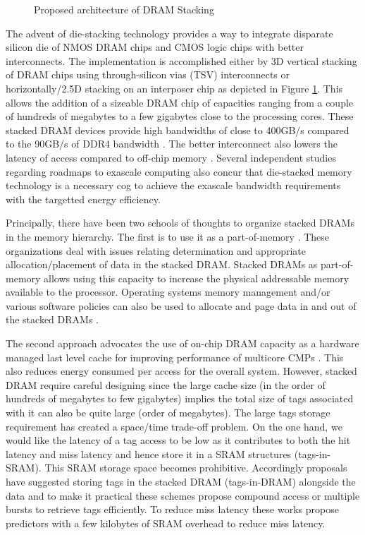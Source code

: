\begin{figure}[!htb]
	\centering
	\def\svgwidth{\columnwidth}
	
	\caption{Proposed architecture of DRAM Stacking}
	\label{fig:stackdram}
\end{figure}
\par The advent of die-stacking technology \cite{3d-stacking} provides a way to integrate disparate silicon die of NMOS DRAM chips and CMOS logic chips with better interconnects. The implementation is accomplished either by 3D vertical stacking of DRAM chips using through-silicon vias (TSV) interconnects or horizontally/2.5D stacking on an interposer chip as depicted in Figure \ref{fig:stackdram}. This allows the addition of a sizeable DRAM chip of capacities ranging from a couple of hundreds of megabytes to a few gigabytes close to the processing cores. These stacked DRAM devices provide high bandwidths of close to 400GB/s compared to the 90GB/s of DDR4 bandwidth \cite{xeonphi}. The better interconnect also lowers the latency of access compared to off-chip memory \cite{alloy}. Several independent studies regarding roadmaps to exascale computing \cite{apu-exascale,amd-exascale1} also concur that die-stacked memory technology is a necessary cog to achieve the exascale bandwidth requirements with the targetted energy efficiency. 
\par Principally, there have been two schools of thoughts to organize stacked DRAMs in the memory hierarchy. The first is to use it as a part-of-memory \cite{pom,cameo}. These organizations deal with issues relating determination and appropriate allocation/placement of data in the stacked DRAM. Stacked DRAMs as part-of-memory allows using this capacity to increase the physical addressable memory available to the processor. Operating systems memory management and/or various software policies can also be used to allocate and page data in and out of the stacked DRAMs \cite{software-dram}.
\par The second approach advocates the use of on-chip DRAM capacity as a hardware managed last level cache for improving performance of multicore CMPs \cite{alloy,bimodal,loh-hill,atcache,footprint}. This also reduces energy consumed per access for the overall system.
However, stacked DRAM require careful designing since the large cache size (in the order of hundreds of megabytes to few gigabytes) implies the total size of tags associated with it can also be quite large (order of megabytes). The large tags storage requirement has created a space/time trade-off problem. On the one hand, we would like the latency of a tag access to be low as it contributes to both the hit latency and miss latency and hence store it in a SRAM structures (tags-in-SRAM). This SRAM storage space becomes prohibitive. Accordingly proposals have suggested storing tags in the stacked DRAM (tags-in-DRAM) alongside the data and to make it practical these schemes propose compound access \cite{loh-hill} or multiple bursts \cite{alloy} to retrieve tags efficiently. To reduce miss latency these works propose predictors with a few kilobytes of SRAM overhead to reduce miss latency.



